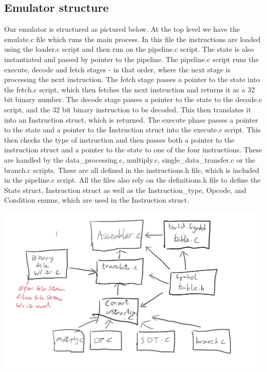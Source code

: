 \documentclass[11pt]{article}
\begin{document}
  \subsection*{Emulator structure}

Our emulator is structured as pictured below. At the top level we have the emulate.c file which runs the main process. In this file the instructions are loaded using the loader.c script and then run on the pipeline.c script. The state is also instantiated and passed by pointer to the pipeline. The pipeline.c script runs the execute, decode and fetch stages - in that order, where the next stage is processing the next instruction. The fetch stage passes a pointer to the state into the fetch.c script, which then fetches the next instruction and returns it as a 32 bit binary number. The decode stage passes a pointer to the state to the decode.c script, and the 32 bit binary instruction to be decoded. This then translates it into an Instruction struct, which is returned. The execute phase passes a pointer to the state and a pointer to the Instruction struct into the execute.c script. This then checks the type of instruction and then passes both a pointer to the instruction struct and a pointer to the state to one of the four instructions. These are handled by the data_processing.c, multiply.c, single_data_transfer.c or the branch.c scripts. These are all defined in the instructions.h file, which is included in the pipeline.c script. All the files also rely on the definitions.h file to define the State struct, Instruction struct as well as the Instruction_type, Opcode, and Condition enums, which are used in the Instruction struct.

  \includegraphics[]{emulate_structure}

  
\end{document}
